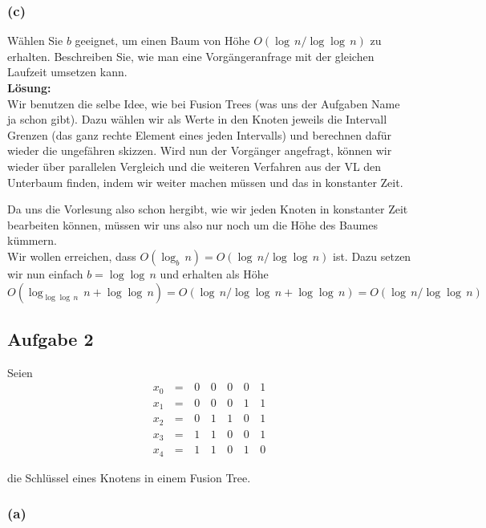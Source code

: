 \documentclass[11pt,a4paper,ngerman]{article}
\begin{document}
\subsubsection*{(c)}

Wählen Sie $b$ geeignet, um einen Baum von Höhe $O(\log \, n / \log \log \, n)$ zu erhalten. Beschreiben Sie, wie man eine Vorgängeranfrage mit der gleichen Laufzeit umsetzen kann.\\

\noindent\textbf{Lösung:}\\

Wir benutzen die selbe Idee, wie bei Fusion Trees (was uns der Aufgaben Name ja schon gibt). Dazu wählen wir als Werte in den Knoten jeweils die Intervall Grenzen (das ganz rechte Element eines jeden Intervalls) und berechnen dafür wieder die ungefähren skizzen. Wird nun der Vorgänger angefragt, können wir wieder über parallelen Vergleich und
die weiteren Verfahren aus der VL den Unterbaum finden, indem wir weiter machen müssen
und das in konstanter Zeit.

Da uns die Vorlesung also schon hergibt, wie wir jeden Knoten in konstanter Zeit bearbeiten können, müssen wir uns also nur noch um die Höhe des Baumes kümmern.\\

Wir wollen erreichen, dass $O(\log_b \, n) = O(\log \, n / \log \log \, n)$ ist.
Dazu setzen wir nun einfach $b = \log \log \, n$ und erhalten als Höhe
$$
   O(\log_{\log\log \, n} \, n + \log \log \, n) = O(\log \, n / \log \log \, n + \log \log \,n) = O(\log \, n / \log \log \, n)
$$

\subsection*{Aufgabe 2}
Seien
$$
\begin{array}{ccccccc}
   x_0 \, &= \,& 0 \, & 0 \, & 0 \, & 0 \,& 1\\
   x_1 &=& 0 & 0 & 0 & 1 & 1\\
   x_2 &=& 0 & 1 & 1 & 0 & 1\\
   x_3 &=& 1 & 1 & 0 & 0 & 1\\
   x_4 &=& 1 & 1 & 0 & 1 & 0
\end{array}
$$

die Schlüssel eines Knotens in einem Fusion Tree.

\subsubsection*{(a)}
\end{document}
